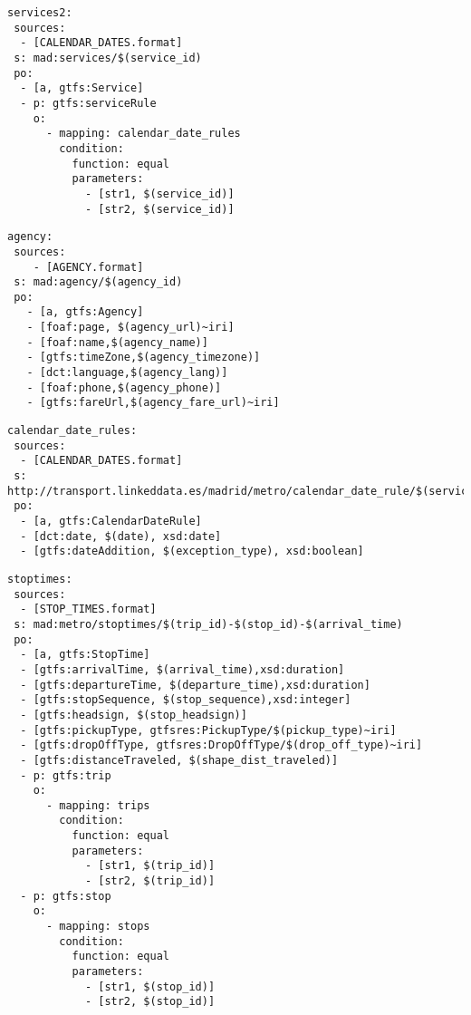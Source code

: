 \begin{lstlisting}[caption=Service\_Calendar\_Date TripleMap, label=lst:service2, basicstyle=\ttfamily,frame=single]
services2:
 sources:
  - [CALENDAR_DATES.format]
 s: mad:services/$(service_id)
 po:
  - [a, gtfs:Service]
  - p: gtfs:serviceRule
    o:
      - mapping: calendar_date_rules
        condition:
          function: equal
          parameters:
            - [str1, $(service_id)]
            - [str2, $(service_id)]
\end{lstlisting}
\begin{lstlisting}[caption=Agency TripleMap, label=lst:agency, basicstyle=\ttfamily,frame=single]
agency:
 sources:
    - [AGENCY.format]
 s: mad:agency/$(agency_id)
 po:
   - [a, gtfs:Agency]
   - [foaf:page, $(agency_url)~iri]
   - [foaf:name,$(agency_name)]
   - [gtfs:timeZone,$(agency_timezone)]
   - [dct:language,$(agency_lang)]
   - [foaf:phone,$(agency_phone)]
   - [gtfs:fareUrl,$(agency_fare_url)~iri]
\end{lstlisting}
\begin{lstlisting}[caption=Calendar\_Date\_Rules TripleMap, label=lst:calendarDateRules, basicstyle=\ttfamily,frame=single]
calendar_date_rules:
 sources:
  - [CALENDAR_DATES.format]
 s: http://transport.linkeddata.es/madrid/metro/calendar_date_rule/$(service_id)-$(date)
 po:
  - [a, gtfs:CalendarDateRule]
  - [dct:date, $(date), xsd:date]
  - [gtfs:dateAddition, $(exception_type), xsd:boolean]
\end{lstlisting}
\begin{lstlisting}[caption=Stop\_Times TripleMap, label=lst:stoptimes, basicstyle=\ttfamily,frame=single]
stoptimes:
 sources:
  - [STOP_TIMES.format]
 s: mad:metro/stoptimes/$(trip_id)-$(stop_id)-$(arrival_time)
 po:
  - [a, gtfs:StopTime]
  - [gtfs:arrivalTime, $(arrival_time),xsd:duration]
  - [gtfs:departureTime, $(departure_time),xsd:duration]
  - [gtfs:stopSequence, $(stop_sequence),xsd:integer]
  - [gtfs:headsign, $(stop_headsign)]
  - [gtfs:pickupType, gtfsres:PickupType/$(pickup_type)~iri]
  - [gtfs:dropOffType, gtfsres:DropOffType/$(drop_off_type)~iri]
  - [gtfs:distanceTraveled, $(shape_dist_traveled)]
  - p: gtfs:trip
    o:
      - mapping: trips
        condition:
          function: equal
          parameters:
            - [str1, $(trip_id)]
            - [str2, $(trip_id)]
  - p: gtfs:stop
    o:
      - mapping: stops
        condition:
          function: equal
          parameters:
            - [str1, $(stop_id)]
            - [str2, $(stop_id)]
\end{lstlisting}
